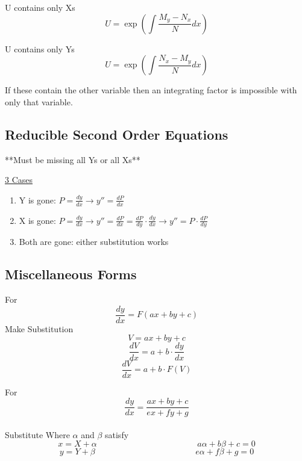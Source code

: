 \documentclass[12pt]{article}
\numberwithin{equation}{subsection}
\newcommand{\derx}[1]{\frac{d #1}{dx}}
\newcommand{\dery}[1]{\frac{d #1}{dy}}
\newcommand{\deryx}{\frac{dy}{dx}}
\newcommand{\inda}{\hspace{.5cm}}
\newcommand{\inde}{\hspace{2.5cm}}
\begin{document}
U contains only Xs
\begin{equation}
U=\exp \left( \int \frac{M_y - N_x}{N}dx \right)
\end{equation}

U contains only Ys
\begin{equation}
U=\exp \left( \int \frac{ N_x -M_y}{N}dx \right)
\end{equation}

If these contain the other variable then an integrating factor is impossible with only that variable.

\subsection{Reducible Second Order Equations}
 
\inda **Must be missing all Ys or all Xs**

\noindent \underline{3 Cases}
\begin{enumerate}
\item Y is gone: $P=\deryx \rightarrow y''= \derx{P}$
\item X is gone: $P=\deryx \rightarrow y''= \derx{P}=\dery{P} \cdot \deryx \rightarrow y''=P \cdot \dery{P}$
\item Both are gone: either substitution works
\end{enumerate}

\subsection{Miscellaneous Forms}
For
\begin{equation}
\deryx =F(ax+by+c)
\end{equation}
Make Substitution 
\begin{equation}
V=ax+by+c
\end{equation}
\begin{equation}
\derx{V}=a+b \cdot \deryx
\end{equation}
\begin{equation}
\derx{V}=a+b \cdot F(V)
\end{equation}
\newpage

For 
\begin{equation}
\deryx = \frac{ax+by+c}{ex+fy+g}
\end{equation}\\

\inde Substitute \hspace{5cm} Where $\alpha$ and $\beta$ satisfy
\begin{equation}
x=X+ \alpha    \hspace{5cm}        a\alpha + b\beta +c=0
\end{equation}
\begin{equation}
y=Y+ \beta    \hspace{5cm}        e\alpha + f\beta +g=0
\end{equation}
\end{document}
